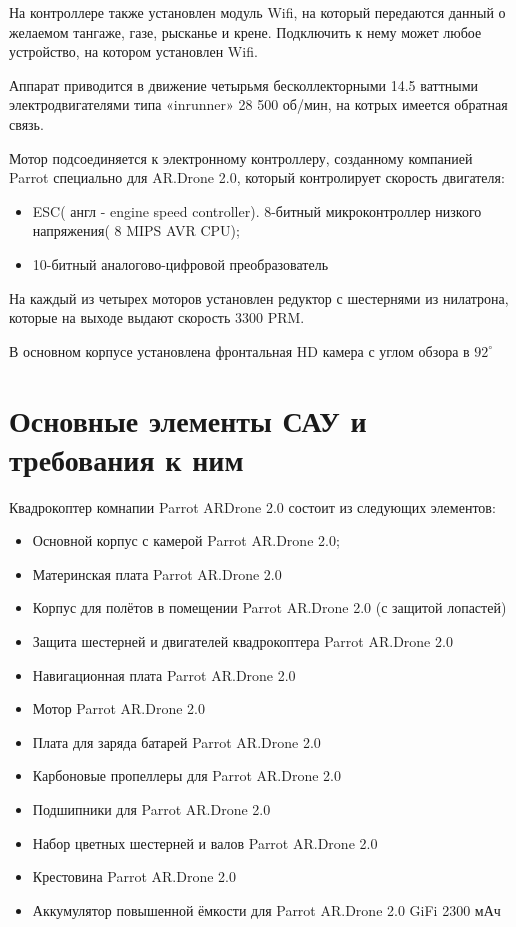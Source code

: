 На контроллере также установлен модуль Wifi, на который передаются данный о желаемом тангаже, газе, рысканье и крене. Подключить к нему может любое устройство, на котором установлен Wifi.

Аппарат приводится в движение четырьмя бесколлекторными 14.5 ваттными электродвигателями типа «inrunner» 28 500 об/мин, на котрых имеется обратная связь.

Мотор подсоединяется к электронному контроллеру, созданному компанией Parrot специально для AR.Drone 2.0, который контролирует скорость двигателя:
\begin{itemize}
\item ESC( англ - engine speed controller). 8-битный микроконтроллер низкого напряжения( 8 MIPS AVR CPU);
\item 10-битный аналогово-цифровой преобразователь
\end{itemize}

На каждый из четырех моторов установлен редуктор с шестернями из нилатрона, которые на выходе выдают скорость 3300 PRM.

В основном корпусе установлена фронтальная HD камера с углом обзора в $92^{\circ}$\cite{1}

\section{Основные элементы САУ и требования к
ним}

Квадрокоптер комнапии Parrot ARDrone 2.0 состоит из следующих элементов:\cite{zap}

\begin{itemize}
\item Основной корпус с камерой Parrot AR.Drone 2.0;
\item Материнская плата Parrot AR.Drone 2.0
\item Корпус для полётов в помещении Parrot AR.Drone 2.0 (с защитой лопастей)
\item Защита шестерней и двигателей квадрокоптера Parrot AR.Drone 2.0
\item Навигационная плата Parrot AR.Drone 2.0
\item Мотор Parrot AR.Drone 2.0
\item Плата для заряда батарей Parrot AR.Drone 2.0
\item Карбоновые пропеллеры для Parrot AR.Drone 2.0
\item Подшипники для Parrot AR.Drone 2.0
\item Набор цветных шестерней и валов Parrot AR.Drone 2.0 
\item Крестовина Parrot AR.Drone 2.0 
\item Аккумулятор повышенной ёмкости для Parrot AR.Drone 2.0 GiFi 2300 мАч
\end{itemize}

